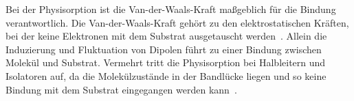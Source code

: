             Bei der Physisorption ist die Van-der-Waals-Kraft maßgeblich für die Bindung verantwortlich.
            Die Van-der-Waals-Kraft gehört zu den elektrostatischen Kräften, bei der keine Elektronen mit dem Substrat ausgetauscht werden~\cite{bergenti_spinterface_2019}.
            Allein die Induzierung und Fluktuation von Dipolen führt zu einer Bindung zwischen Molekül und Substrat.
            Vermehrt tritt die Physisorption bei Halbleitern und Isolatoren auf, da die Molekülzustände in der Bandlücke liegen und so keine Bindung mit dem Substrat eingegangen werden kann~\cite{IF_1}.
        
